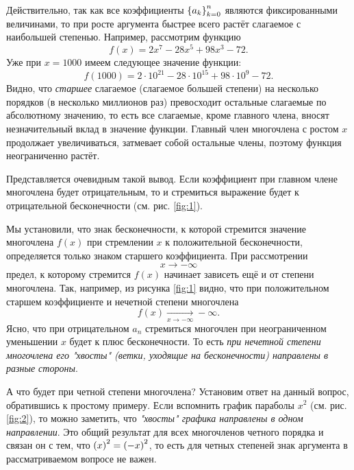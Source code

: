 \documentclass[12pt]{article}
\begin{document}
Действительно, так как все коэффициенты $\qty{a_k}_{k=0}^n$ являются фиксированными величинами, то при росте аргумента быстрее всего растёт слагаемое с наибольшей степенью. Например, рассмотрим функцию
\begin{equation}
f(x)=2x^{7} - 28 x^{5} + 98 x^{3} - 72.
\end{equation}
Уже при $x = 1000$ имеем следующее значение функции:
\begin{equation}
f(1000) = 2 \cdot 10^{21} - 28 \cdot 10^{15} + 98 \cdot 10^9 - 72.
\end{equation}
Видно, что \emph{старшее} слагаемое (слагаемое большей степени) на несколько порядков (в несколько миллионов раз) превосходит остальные слагаемые по абсолютному значению, то есть все слагаемые, кроме главного члена, вносят незначительный вклад в значение функции. Главный член многочлена с ростом $x$ продолжает увеличиваться, затмевает собой остальные члены, поэтому функция неограниченно растёт.
\par
Представляется очевидным такой вывод. Если коэффициент при главном члене многочлена будет отрицательным, то и стремиться выражение будет к отрицательной бесконечности (см. рис. \ref{fig:1}).
\par 
Мы установили, что знак бесконечности, к которой стремится значение многочлена $f(x)$ при стремлении $x$ к положительной бесконечности, определяется только знаком старшего коэффициента. При рассмотрении 
\begin{equation}
x\rightarrow-\infty
\end{equation}
предел, к которому стремится $f(x)$ начинает зависеть ещё и от степени многочлена. Так, например, из рисунка \ref{fig:1} видно, что при положительном старшем коэффициенте и нечетной степени многочлена 
\begin{equation}
	f(x) \underset{x\rightarrow-\infty}{\longrightarrow}-\infty.
\end{equation}
Ясно, что при отрицательном $a_n$ стремиться многочлен при неограниченном уменьшении $x$ будет к плюс бесконечности. То есть \emph{при нечетной степени многочлена его "хвосты" (ветки, уходящие на бесконечности) направлены в разные стороны}. 
\par 
А что будет при четной степени многочлена? Установим ответ на данный вопрос, обратившись к простому примеру. Если вспомнить график параболы $x^2$ (см. рис. \ref{fig:2}), то можно заметить, что \emph{"хвосты" графика направлены в одном направлении}. Это общий результат для всех многочленов четного порядка и связан он с тем, что $\qty(x)^2 = \qty(-x)^2$, то есть для четных степеней знак аргумента в рассматриваемом вопросе не важен. 
\end{document}
